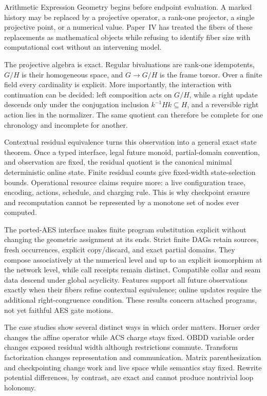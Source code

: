 Arithmetic Expression Geometry begins before endpoint evaluation.  A marked
history may be replaced by a projective operator, a rank-one projector, a
single projective point, or a numerical value.  Paper~IV has treated the fibers
of these replacements as mathematical objects while refusing to identify
fiber size with computational cost without an intervening model.

The projective algebra is exact.  Regular bivaluations are rank-one idempotents,
$G/H$ is their homogeneous space, and $G\to G/H$ is the frame torsor.  Over a
finite field every cardinality is explicit.  More importantly, the interaction
with continuation can be decided: left composition acts on $G/H$, while a
right update descends only under the conjugation inclusion
$k^{-1}Hk\subseteq H$, and a reversible right action lies in the normalizer.
The same quotient can therefore be complete for one chronology and incomplete
for another.

Contextual residual equivalence turns this observation into a general exact
state theorem.  Once a typed interface, legal future monoid, partial-domain
convention, and observation are fixed, the residual quotient is the canonical
minimal deterministic online state.  Finite residual counts give fixed-width
state-selection bounds.  Operational resource claims require more: a live
configuration trace, encoding, actions, schedule, and charging rule.  This is
why checkpoint erasure and recomputation cannot be represented by a monotone
set of nodes ever computed.

The ported-AES interface makes finite program substitution explicit without
changing the geometric assignment at its ends.  Strict finite DAGs retain
sources, fresh occurrences, explicit copy/discard, and exact partial domains.
They compose associatively at the numerical level and up to an explicit
isomorphism at the network level, while call receipts remain distinct.
Compatible collar and seam data descend under global acyclicity.  Features
support all future observations exactly when their fibers refine contextual
equivalence; online updates require the additional right-congruence condition.
These results concern attached programs, not yet faithful AES gate motions.

The case studies show several distinct ways in which order matters.  Horner
order changes the affine operator while ACS charge stays fixed.  OBDD variable
order changes exposed residual width although restrictions commute.  Transform
factorization changes representation and communication.  Matrix
parenthesization and checkpointing change work and live space while semantics
stay fixed.  Rewrite potential differences, by contrast, are exact and cannot
produce nontrivial loop holonomy.

